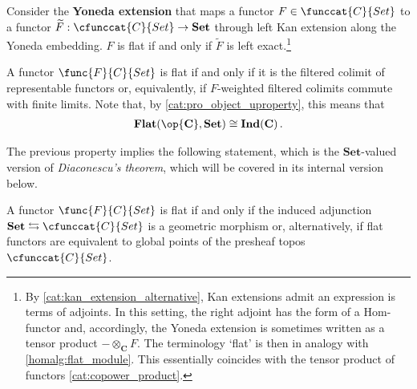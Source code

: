     \begin{property}
        Consider the \textbf{Yoneda extension} that maps a functor $F\in\funccat{C}{Set}$ to a functor $\widetilde{F}:\cfunccat{C}{Set}\rightarrow\mathbf{Set}$ through left Kan extension along the Yoneda embedding. $F$ is flat if and only if $\widetilde{F}$ is left exact.\footnote{By \cref{cat:kan_extension_alternative}, Kan extensions admit an expression is terms of adjoints. In this setting, the right adjoint has the form of a Hom-functor and, accordingly, the Yoneda extension is sometimes written as a tensor product $-\otimes_{\mathbf{C}}F$. The terminology `flat' is then in analogy with \cref{homalg:flat_module}. This essentially coincides with the tensor product of functors \cref{cat:copower_product}.}
    \end{property}
    \begin{property}\label{topos:flat_or_ind}
        A functor $\func{F}{C}{Set}$ is flat if and only if it is the filtered colimit of representable functors or, equivalently, if $F$-weighted filtered colimits commute with finite limits. Note that, by \cref{cat:pro_object_uproperty}, this means that
        \begin{gather}
            \mathbf{Flat(\op{C},Set)}\cong\mathbf{Ind(C)}\,.
        \end{gather}
    \end{property}

    The previous property implies the following statement, which is the $\mathbf{Set}$-valued version of \textit{Diaconescu's theorem}, which will be covered in its internal version below.
    \begin{theorem}
        A functor $\func{F}{C}{Set}$ is flat if and only if the induced adjunction $\mathbf{Set}\leftrightarrows\cfunccat{C}{Set}$ is a geometric morphism or, alternatively, if flat functors are equivalent to global points of the presheaf topos $\cfunccat{C}{Set}$.
    \end{theorem}


